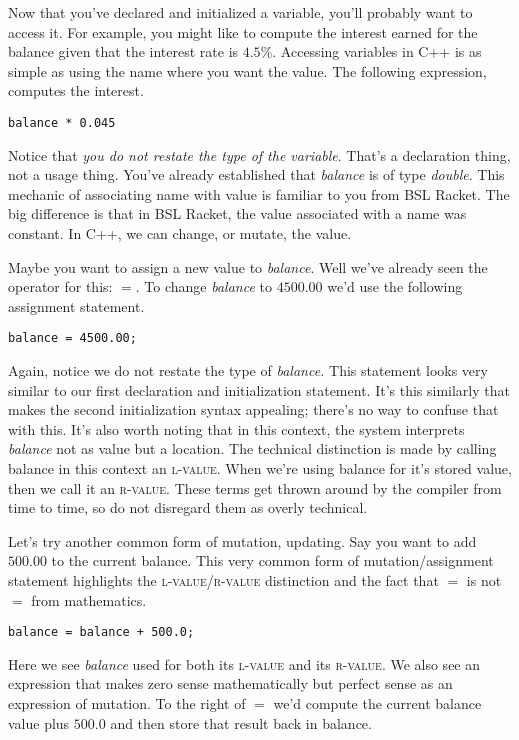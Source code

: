 \documentclass[]{tufte-handout}
\begin{document}
Now that you've declared and initialized a variable, you'll probably want to access it. For example, you might like to compute the interest earned for the balance given that the interest rate is $4.5\%$.  Accessing variables in C++ is as simple as using the name where you want the value.  The following expression, computes the interest.
\begin{verbatim}
balance * 0.045
\end{verbatim}
Notice that \textit{you do not restate the type of the variable}.  That's a declaration thing, not a usage thing. You've already established that \textit{balance} is of type \textit{double}.  This mechanic of associating name with value is familiar to you from BSL Racket. The big difference is that in BSL Racket, the value associated with a name was constant. In C++, we can change, or mutate, the value. 

Maybe you want to assign a new value to \textit{balance}. Well we've already seen the operator for this: $=$. To change \textit{balance} to $4500.00$ we'd use the following assignment statement.
\begin{verbatim}
balance = 4500.00;
\end{verbatim}
Again, notice we do not restate the type of \textit{balance.} This statement looks very similar to our first declaration and initialization statement. It's this similarly that makes the second initialization syntax appealing; there's no way to confuse that with this. It's also worth noting that in this context, the system interprets \textit{balance} not as value but a location. The technical distinction is made by calling balance in this context an \textsc{l-value}. When we're using balance for it's stored value, then we call it an \textsc{r-value}. These terms get thrown around by the compiler from time to time, so do not disregard them as overly technical. 

Let's try another common form of mutation, updating. Say you want to add $500.00$ to the current balance. This very common form of mutation/assignment statement highlights the \textsc{l-value}/\textsc{r-value} distinction and the fact that $=$ is not $=$ from mathematics.
\begin{verbatim} 
balance = balance + 500.0;
\end{verbatim}
Here we see \textit{balance} used for both its \textsc{l-value} and its \textsc{r-value}. We also see an expression that makes zero sense mathematically but perfect sense as an expression of mutation. To the right of $=$ we'd compute the current balance value plus $500.0$ and then store that result back in balance. 
\end{document}

